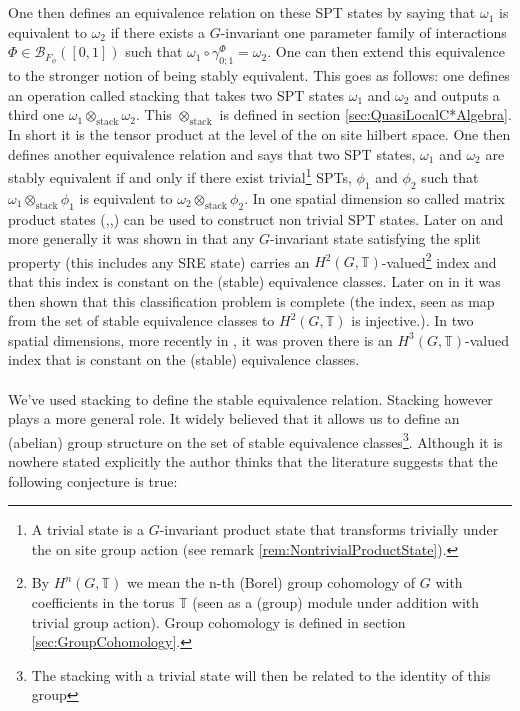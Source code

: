 \documentclass[12pt,a4paper,twoside]{article}
\newcommand{\BB}{\mathcal B}
\newcommand{\TT}{\mathbb T}
\theoremstyle{definition}
\numberwithin{equation}{section}
\begin{document}
\\\\
One then defines an equivalence relation on these SPT states by saying that $\omega_1$ is equivalent to $\omega_2$ if there exists a $G$-invariant one parameter family of interactions $\Phi\in\BB_{F_\phi}([0,1])$ such that $\omega_1\circ\gamma^\Phi_{0;1}=\omega_2$. One can then extend this equivalence to the stronger notion of being stably equivalent. This goes as follows: one defines an operation called stacking that takes two SPT states $\omega_1$ and $\omega_2$ and outputs a third one $\omega_1\otimes_{\text{stack}}\omega_2$. This $\otimes_\text{stack}$ is defined in section \ref{sec:QuasiLocalC*Algebra}. In short it is the tensor product at the level of the on site hilbert space. One then defines another equivalence relation and says that two SPT states, $\omega_1$ and $\omega_2$ are stably equivalent if and only if there exist trivial\footnote{A trivial state is a $G$-invariant product state that transforms trivially under the on site group action (see remark \ref{rem:NontrivialProductState}).} SPTs, $\phi_1$ and $\phi_2$ such that $\omega_1\otimes_{\text{stack}}\phi_1$ is equivalent to $\omega_2\otimes_{\text{stack}}\phi_2$.
\newpage
In one spatial dimension so called matrix product states (\cite{Chen_2011},\cite{pollman2012symmetry},\cite{schuch2011MatrixProduct}) can be used to construct non trivial SPT states. Later on and more generally it was shown in \cite{ogata2019classification} that any $G$-invariant state satisfying the split property (this includes any SRE state) carries an $H^2(G,\TT)$-valued\footnote{By $H^n(G,\TT)$ we mean the n-th (Borel) group cohomology of $G$ with coefficients in the torus $\TT$ (seen as a (group) module under addition with trivial group action). Group cohomology is defined in section \ref{sec:GroupCohomology}.} index and that this index is constant on the (stable) equivalence classes. Later on in \cite{kapustin2021classification} it was then shown that this classification problem is complete (the index, seen as map from the set of stable equivalence classes to $H^2(G,\TT)$ is injective.). In two spatial dimensions, more recently in \cite{ogata2021h3gmathbb}, it was proven there is an $H^3(G,\TT)$-valued index that is constant on the (stable) equivalence classes.
\\\\
We've used stacking to define the stable equivalence relation. Stacking however plays a more general role. It widely believed that it allows us to define an (abelian) group structure on the set of stable equivalence classes\footnote{The stacking with a trivial state will then be related to the identity of this group}. Although it is nowhere stated explicitly the author thinks that the literature suggests that the following conjecture is true:
\end{document}
